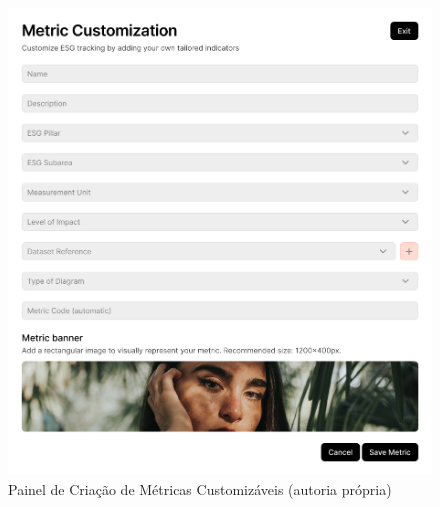 \begin{figure}[H]
    \centering
    \includegraphics[width=\linewidth]{frontmatter/assets/mockup/Custom Metric Creation.png}
    \caption{Painel de Criação de Métricas Customizáveis (autoria própria)}
    \label{fig:customMetricModal}
\end{figure}


